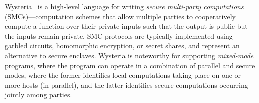 Wysteria~\cite{wysteria} is a high-level language for writing \emph{secure
multi-party computations} (SMCs)---computation schemes that allow
multiple parties to cooperatively compute a function over their private
inputs such that the output is public but the inputs remain private. 
%
SMC protocols are typically implemented using garbled circuits, homomorphic
encryption, or secret shares, and represent an alternative to secure enclaves.
%
Wysteria is noteworthy for supporting \emph{mixed-mode} programs, where the
program can operate in a combination of parallel and secure modes, where the
former identifies local computations taking place on one or more hosts (in
parallel), and the latter identifies secure computations occurring
jointly among parties. 
%





